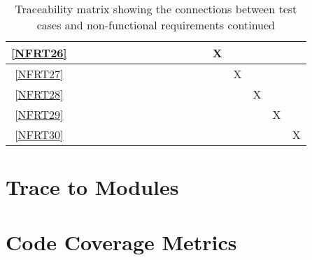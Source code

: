 \documentclass[12pt, titlepage]{article}
\begin{document}
\begin{landscape}
\begin{table}[h!]
\begin{tabular}{|c|c|c|c|c|c|c|c|c|c|c|c|c|c|c|c|c|c|}
      \ref{NFRT26} &      &      &     &     &     &     &     &     &     &     &     &     & X   &     &     &     &     \\ \hline
      \ref{NFRT27} &      &      &     &     &     &     &     &     &     &     &     &     &     & X   &     &     &     \\ \hline
      \ref{NFRT28} &      &      &     &     &     &     &     &     &     &     &     &     &     &     & X   &     &     \\ \hline
      \ref{NFRT29} &      &      &     &     &     &     &     &     &     &     &     &     &     &     &     & X   &     \\ \hline
      \ref{NFRT30} &      &      &     &     &     &     &     &     &     &     &     &     &     &     &     &     & X   \\ \hline
    \end{tabular}
    \caption{Traceability matrix showing the connections between test cases
      and non-functional requirements continued}
    \label{tab:nfrt2}
  \end{table}
\end{landscape}
\restoregeometry

\section{Trace to Modules}		

\section{Code Coverage Metrics}
\end{document}
